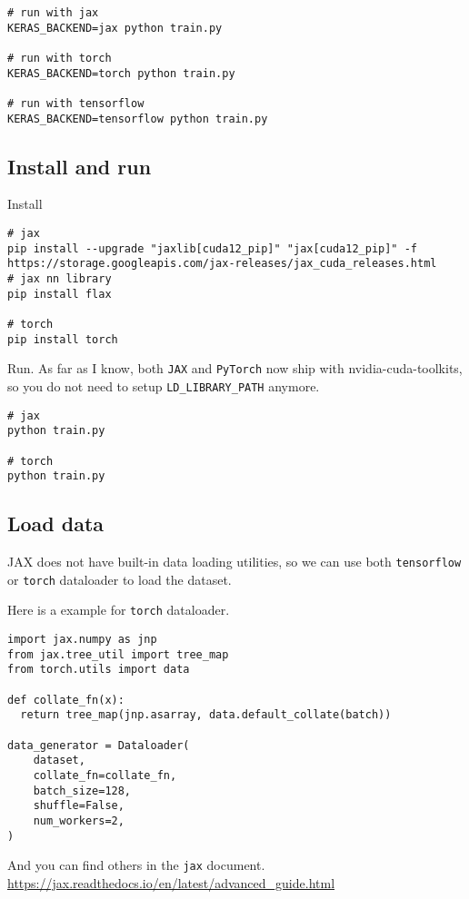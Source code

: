 \documentclass[11pt]{article}
\begin{document}
\begin{verbatim}
# run with jax
KERAS_BACKEND=jax python train.py

# run with torch
KERAS_BACKEND=torch python train.py

# run with tensorflow
KERAS_BACKEND=tensorflow python train.py
\end{verbatim}
\subsection{Install and run}
\label{sec:org8282286}

Install

\begin{verbatim}
# jax
pip install --upgrade "jaxlib[cuda12_pip]" "jax[cuda12_pip]" -f https://storage.googleapis.com/jax-releases/jax_cuda_releases.html
# jax nn library
pip install flax

# torch
pip install torch
\end{verbatim}

Run.  As far as I know, both \texttt{JAX} and \texttt{PyTorch} now ship with nvidia-cuda-toolkits, so you do not need to setup \texttt{LD\_LIBRARY\_PATH} anymore.

\begin{verbatim}
# jax
python train.py

# torch
python train.py
\end{verbatim}
\subsection{Load data}
\label{sec:orga4151ce}

JAX does not have built-in data loading utilities, so we can use both \texttt{tensorflow} or \texttt{torch} dataloader to load the dataset.

Here is a example for \texttt{torch} dataloader.

\begin{verbatim}
import jax.numpy as jnp
from jax.tree_util import tree_map
from torch.utils import data

def collate_fn(x):
  return tree_map(jnp.asarray, data.default_collate(batch))

data_generator = Dataloader(
    dataset,
    collate_fn=collate_fn,
    batch_size=128,
    shuffle=False,
    num_workers=2,
)
\end{verbatim}

And you can find others in the \texttt{jax} document.  \url{https://jax.readthedocs.io/en/latest/advanced\_guide.html}
\end{document}
